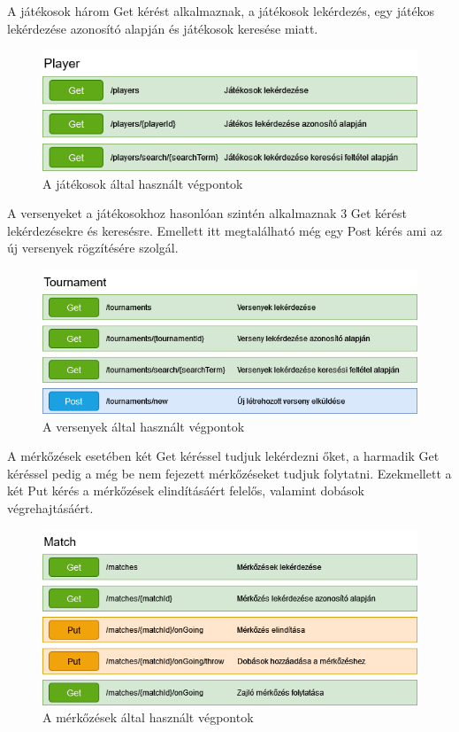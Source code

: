 A játékosok három Get kérést alkalmaznak, a játékosok lekérdezés, egy játékos lekérdezése azonosító alapján és játékosok keresése miatt.

\begin{figure}[h]
\centering
\includegraphics[scale=0.3]{images/Player_Vegpontok.drawio.png}
\caption{A játékosok által használt végpontok}
\label{fig:cimer}
\end{figure}

A versenyeket a játékosokhoz hasonlóan szintén alkalmaznak 3 Get kérést lekérdezésekre és keresésre. Emellett itt megtalálható még egy Post kérés ami az új versenyek rögzítésére szolgál.

\begin{figure}[h]
\centering
\includegraphics[scale=0.3]{images/Tournament_Vegpontok.drawio.png}
\caption{A versenyek által használt végpontok}
\label{fig:cimer}
\end{figure}

A mérkőzések esetében két Get kéréssel tudjuk lekérdezni őket, a harmadik Get kéréssel pedig a még be nem fejezett mérkőzéseket tudjuk folytatni. Ezekmellett a két Put kérés a mérkőzések elindításáért felelős, valamint dobások végrehajtásáért.

\begin{figure}[h]
\centering
\includegraphics[scale=0.3]{images/Merkozes_Vegpontok.drawio.png}
\caption{A mérkőzések által használt végpontok}
\label{fig:cimer}
\end{figure}